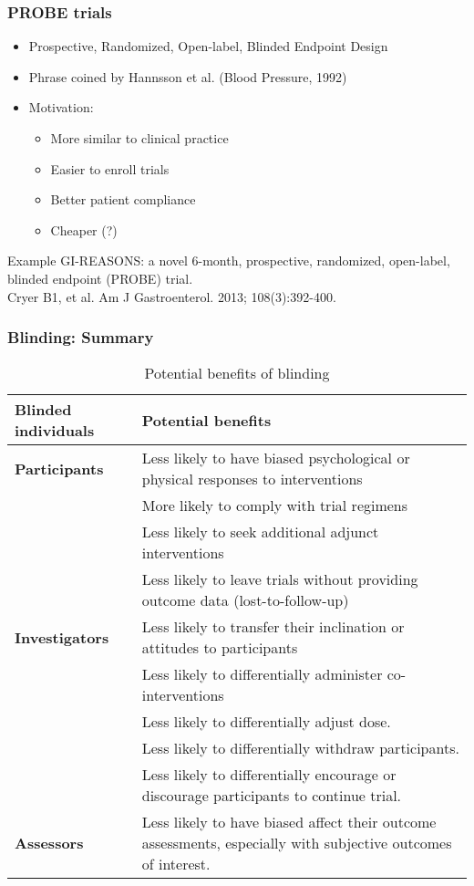 \documentclass[table,10pt]{beamer}
\begin{document}
\begin{CJK*}{UTF8}{gbsn}
\begin{frame}[t]
\frametitle{PROBE trials}
\begin{itemize}
	\item \alert{P}rospective, \alert{R}andomized, \alert{O}pen-label,
		\alert{B}linded \alert{E}ndpoint Design
	\item Phrase coined by Hannsson et al. (Blood Pressure, 1992)
	\item Motivation:
	\begin{itemize}
		\item More similar to clinical practice
		\item Easier to enroll trials
		\item Better patient compliance
		\item Cheaper (?)
	\end{itemize}
\end{itemize}
\begin{alertblock}{\center Example}
\alert{GI-REASONS: a novel 6-month, prospective, randomized, open-label, blinded endpoint (PROBE) trial.}\\
\small{Cryer B1, et al. Am J Gastroenterol. 2013; 108(3):392-400.} 
\end{alertblock}
\end{frame}

\begin{frame}[t]
\frametitle{Blinding: Summary}
\begin{table}
\footnotesize
\caption{Potential benefits of blinding}
\begin{tabular}{p{}p{}}
\hline
{\bf Blinded individuals} & {\bf Potential benefits}\\
\hline
{\bf Participants} & Less likely to have biased psychological or physical responses to interventions\\
& More likely to comply with trial regimens\\
& Less likely to seek additional adjunct interventions\\
& Less likely to leave trials without providing outcome data (lost-to-follow-up)\\
\hline
{\bf Investigators} & Less likely to transfer their inclination or attitudes to participants\\
& Less likely to differentially administer co-interventions\\
& Less likely to differentially adjust dose.\\
& Less likely to differentially withdraw participants.\\
& Less likely to differentially encourage or discourage participants to continue trial.\\
\hline
{\bf Assessors} & Less likely to have biased affect their outcome assessments, especially with subjective outcomes of interest.\\
\hline 
\end{tabular}
\end{table}
\end{frame}


\end{CJK*}
\end{document}
